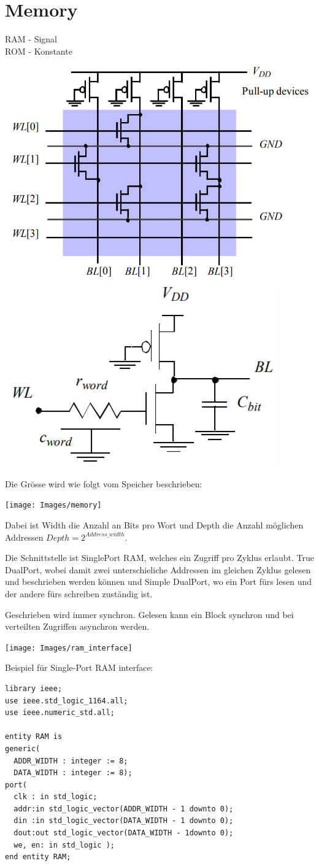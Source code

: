 \section{Memory}
RAM - Signal\\
ROM - Konstante
\begin{center}
	\includegraphics[width=0.5\columnwidth]{Images/rom_matrix.png}
	\includegraphics[width=0.45\columnwidth]{Images/basic_cell.png}
\end{center}

\noindent
Die Grösse wird wie folgt vom Speicher beschrieben:
\begin{center}
	\texttt{[image: Images/memory]}
\end{center}
Dabei ist Width die Anzahl an Bits pro Wort und Depth die Anzahl möglichen Addressen $Depth=2^{Address\_width}$. 

Die Schnittstelle ist SinglePort RAM, welches ein Zugriff pro Zyklus erlaubt. True DualPort, wobei damit zwei unterschieliche Addressen im gleichen Zyklus gelesen und beschrieben werden können und Simple DualPort, wo ein Port fürs lesen und der andere fürs schreiben zuständig ist.

Geschrieben wird immer synchron. Gelesen kann ein Block synchron und bei verteilten Zugriffen asynchron werden.

\begin{center}
	\texttt{[image: Images/ram\_interface]}
\end{center}
Beispiel für Single-Port RAM interface:
\begin{lstlisting}
library ieee;
use ieee.std_logic_1164.all;
use ieee.numeric_std.all;

entity RAM is
generic(
  ADDR_WIDTH : integer := 8;
  DATA_WIDTH : integer := 8);
port(
  clk : in std_logic;
  addr:in std_logic_vector(ADDR_WIDTH - 1 downto 0);
  din :in std_logic_vector(DATA_WIDTH - 1 downto 0);
  dout:out std_logic_vector(DATA_WIDTH - 1downto 0);
  we, en: in std_logic ); 
end entity RAM;
\end{lstlisting}

